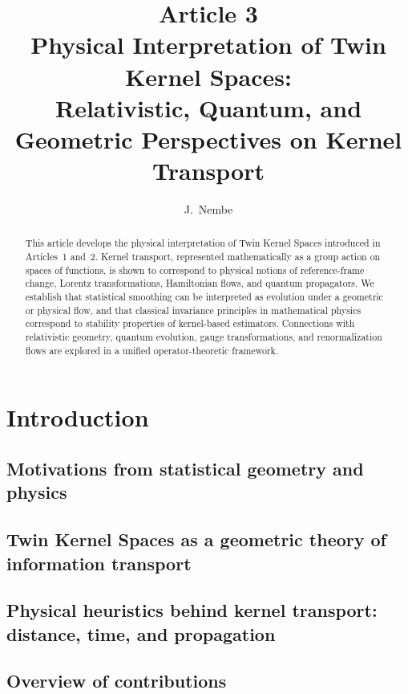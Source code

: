 \documentclass[11pt]{article}
\title{%
	{\Large \textbf{Article 3}}\\[6pt]
	\textbf{Physical Interpretation of Twin Kernel Spaces:\\
		Relativistic, Quantum, and Geometric Perspectives on Kernel Transport}
}
\author{J.~Nembe}
\date{}
\theoremstyle{definition}
\begin{document}
	
	\maketitle
	
	\begin{abstract}
		This article develops the physical interpretation of Twin Kernel Spaces introduced in Articles~1 and~2.
		Kernel transport, represented mathematically as a group action on spaces of functions, is shown to correspond to physical notions of reference-frame change, Lorentz transformations, Hamiltonian flows, and quantum propagators.
		We establish that statistical smoothing can be interpreted as evolution under a geometric or physical flow, and that classical invariance principles in mathematical physics correspond to stability properties of kernel-based estimators.
		Connections with relativistic geometry, quantum evolution, gauge transformations, and renormalization flows are explored in a unified operator-theoretic framework.
	\end{abstract}
	
	\tableofcontents
	
	\section{Introduction}
	
	\subsection{Motivations from statistical geometry and physics}
	
	\subsection{Twin Kernel Spaces as a geometric theory of information transport}
	
	\subsection{Physical heuristics behind kernel transport: distance, time, and propagation}
	
	\subsection{Overview of contributions}
	
\end{document}
